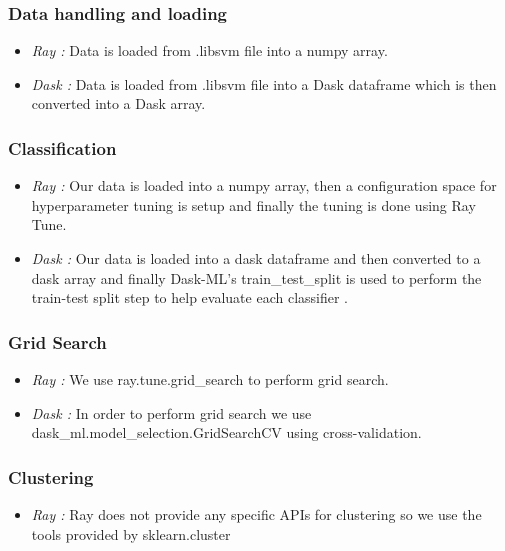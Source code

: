 \documentclass[conference]{IEEEtran}
\begin{document}
\subsubsection{Data handling and loading}
\begin{itemize}
    \item \textit{Ray :} Data is loaded from .libsvm file into a numpy array. 
\end{itemize}
\begin{itemize}
    \item \textit{Dask :} Data is loaded from .libsvm file into a Dask dataframe which is then converted into a Dask array.
\end{itemize}
\subsubsection{Classification}  
\begin{itemize}
    \item \textit{Ray :} Our data is loaded into a numpy array, then a configuration space for hyperparameter tuning is setup and finally the tuning is done using Ray Tune.
\end{itemize}
\begin{itemize}
    \item \textit{Dask :} Our data is loaded into a dask dataframe and then converted to a dask array and finally Dask-ML's train\_test\_split is used to perform the train-test split step to help evaluate each classifier .
\end{itemize}
\subsubsection{Grid Search}
\begin{itemize}
\item \textit{Ray :} We use ray.tune.grid\_search to perform grid search.
\end{itemize}
\begin{itemize}
\item \textit{Dask :} In order to perform grid search we use dask\_ml.model\_selection.GridSearchCV using cross-validation.
\end{itemize}
\subsubsection{Clustering}
\begin{itemize}
    \item \textit{Ray :} Ray does not provide any specific APIs for clustering so we use the tools provided by sklearn.cluster
\end{itemize}
\end{document}

